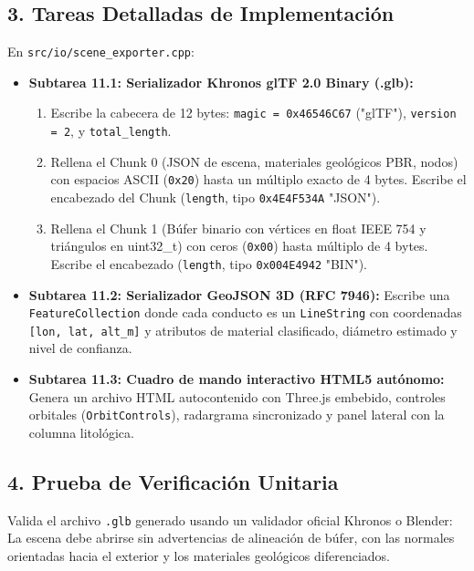 \documentclass[11pt,a4paper]{article}
\begin{document}
\subsection{3. Tareas Detalladas de Implementación}
En \texttt{src/io/scene\_exporter.cpp}:
\begin{itemize}
    \item \textbf{Subtarea 11.1: Serializador Khronos glTF 2.0 Binary (.glb):}
    \begin{enumerate}
        \item Escribe la cabecera de 12 bytes: \texttt{magic = 0x46546C67} ("glTF"), \texttt{version = 2}, y \texttt{total\_length}.
        \item Rellena el Chunk 0 (JSON de escena, materiales geológicos PBR, nodos) con espacios ASCII (\texttt{0x20}) hasta un múltiplo exacto de 4 bytes. Escribe el encabezado del Chunk (\texttt{length}, tipo \texttt{0x4E4F534A} "JSON").
        \item Rellena el Chunk 1 (Búfer binario con vértices en float IEEE 754 y triángulos en uint32\_t) con ceros (\texttt{0x00}) hasta múltiplo de 4 bytes. Escribe el encabezado (\texttt{length}, tipo \texttt{0x004E4942} "BIN").
    \end{enumerate}

    \item \textbf{Subtarea 11.2: Serializador GeoJSON 3D (RFC 7946):}
    Escribe una \texttt{FeatureCollection} donde cada conducto es un \texttt{LineString} con coordenadas \texttt{[lon, lat, alt\_m]} y atributos de material clasificado, diámetro estimado y nivel de confianza.

    \item \textbf{Subtarea 11.3: Cuadro de mando interactivo HTML5 autónomo:}
    Genera un archivo HTML autocontenido con Three.js embebido, controles orbitales (\texttt{OrbitControls}), radargrama sincronizado y panel lateral con la columna litológica.
\end{itemize}

\subsection{4. Prueba de Verificación Unitaria}
Valida el archivo \texttt{.glb} generado usando un validador oficial Khronos o Blender:
La escena debe abrirse sin advertencias de alineación de búfer, con las normales orientadas hacia el exterior y los materiales geológicos diferenciados.

\end{document}
